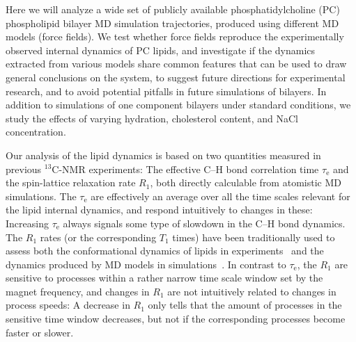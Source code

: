 \documentclass[journal=jpcbfk,manuscript=article,layout=twocolumn]{achemso}
\begin{document}
%
Here we will analyze a wide set of publicly available phosphatidylcholine (PC) phospholipid bilayer MD simulation trajectories, produced using different MD models (force fields). We test whether force fields reproduce the experimentally observed internal dynamics of PC lipids, and investigate if the dynamics extracted from various models share common features that can be used to draw general conclusions on the system, to suggest future directions for experimental research, and to avoid potential pitfalls in future simulations of bilayers.  In addition to simulations of one component bilayers under standard conditions, we study the effects of varying hydration, cholesterol content, and NaCl concentration.

Our analysis of the lipid dynamics is based on two quantities measured in previous $^{13}$C-NMR experiments:
The effective C--H bond correlation time $\tau_\mathrm{e}$ and
the spin-lattice relaxation rate $R_{1}$,
both %
directly calculable from atomistic MD simulations.
The
$\tau_\mathrm e$ are effectively an average over all the time scales relevant for the lipid internal dynamics,
and respond intuitively to changes in these: 
Increasing $\tau_\mathrm{e}$ always signals some type of slowdown in the C--H bond dynamics. %
\cite{ferreira15}
%
The $R_{1}$ rates (or the corresponding $T_{1}$ times) have been traditionally used to assess both the conformational dynamics of lipids in experiments~\cite{feller02,eldho03,wohlert06,klauda08,leftin11} and the dynamics produced by MD models in simulations~\cite{feller02,wohlert06,klauda08,klauda08II}.
In contrast to $\tau_\mathrm e$, the $R_1$ are sensitive to processes within a rather narrow time scale window set by the magnet frequency, and changes in $R_1$ are not intuitively related to changes in process speeds: A decrease in $R_1$ only tells that the amount of processes in the sensitive time window decreases, but not if the corresponding processes become faster or slower.
\end{document}
